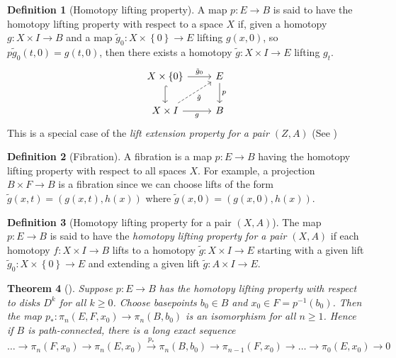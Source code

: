 \documentclass[reqno]{amsart}
\newtheorem{theorem}{Theorem}[section]
\theoremstyle{definition}
\newtheorem{definition}[theorem]{Definition}
\theoremstyle{remark}
\begin{document}
\begin{definition}[Homotopy lifting property]
    A map $p \colon E \to B$ is said to have the
    homotopy lifting property with respect to
    a space $X$ if, given a homotopy
    $g \colon X \times I \to B$ and a map
    $\tilde{g}_0 \colon X \times \left\{ 0 \right\}  \to E$ lifting
    $g(x,0)$, so $p \tilde{g}_0(t,0) = g(t,0)$, then
    there exists a homotopy
    $\tilde{g} \colon X \times I \to E$ lifting
    $g_t$.
    \begin{equation*}
    \begin{tikzcd}
        X \times \left\{ 0 \right\} \ar[d, hookrightarrow] 
        \ar[r, "\tilde{g}_0"] & E \ar[d, "p"] \\
        X \times I \ar[r, "g"'] \ar[ru, dashed, "\tilde{g}"'] & B
    \end{tikzcd}
    \end{equation*}
    This is a special case of the \textit{lift extension property
    for a pair $\left( Z,A \right) $} (See \cite{Munkres})
\end{definition}

\begin{definition}[Fibration]
    A fibration is a map $p \colon E \to B$ having the
    homotopy lifting property with respect to
    all spaces $X$. For example, a projection
    $B \times F \to B$ is a fibration
    since we can choose lifts of the form
    $\tilde{g}(x,t) = \left( g(x,t),h(x) \right) $ 
    where $\tilde{g}(x,0) = \left( g(x,0),h(x) \right) $.
\end{definition}

\begin{definition}[Homotopy lifting property for a pair
    $(X,A)$]
   The map $p \colon E \to B$ is said to have the
   \textit{homotopy lifting property for a pair
   $(X,A)$} if each homotopy
   $f \colon X \times I \to B$ lifts to a homotopy
   $\tilde{g} \colon X \times I \to E$ starting
   with a given lift $\tilde{g}_0 \colon 
   X \times \left\{ 0 \right\} \to E$ and
   extending a given lift 
   $\tilde{g} \colon A \times I \to E$.
\end{definition}

\begin{theorem}[]
    Suppose $p \colon E \to B$ has the homotopy
    lifting property with respect to disks
    $D^{k}$ for all $k \ge 0$. Choose basepoints
    $b_0 \in B$ and
    $x_0 \in F = p^{-1}\left( b_0 \right) $. Then
    the map $p_* \colon \pi_n \left( E, F,x_0 \right) 
    \to \pi_n \left( B, b_0 \right) $ is an isomorphism
    for all $n\ge 1$. Hence if $B$ is
    path-connected, there is a long exact sequence
    \[
    \ldots \to \pi_n \left( F,x_0 \right) \to 
    \pi_n \left( E,x_0 \right) \stackrel{p_*}{\to }
    \pi_n \left( B,b_0 \right) \to 
    \pi_{n-1}(F,x_0) \to \ldots \to 
    \pi_0 \left( E,x_0 \right) \to 0
    \] 
\end{theorem}
\end{document}
